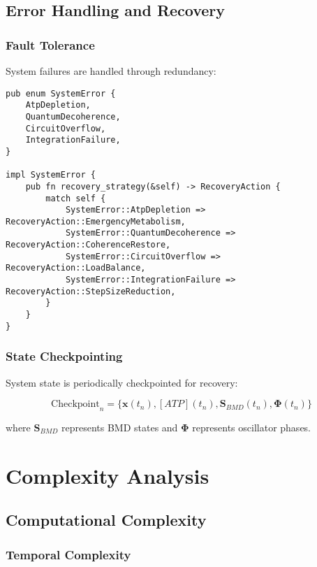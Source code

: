 \documentclass[12pt,a4paper]{article}
\begin{document}
\subsection{Error Handling and Recovery}

\subsubsection{Fault Tolerance}

System failures are handled through redundancy:

\begin{lstlisting}[style=ruststyle]
pub enum SystemError {
    AtpDepletion,
    QuantumDecoherence,
    CircuitOverflow,
    IntegrationFailure,
}

impl SystemError {
    pub fn recovery_strategy(&self) -> RecoveryAction {
        match self {
            SystemError::AtpDepletion => RecoveryAction::EmergencyMetabolism,
            SystemError::QuantumDecoherence => RecoveryAction::CoherenceRestore,
            SystemError::CircuitOverflow => RecoveryAction::LoadBalance,
            SystemError::IntegrationFailure => RecoveryAction::StepSizeReduction,
        }
    }
}
\end{lstlisting}

\subsubsection{State Checkpointing}

System state is periodically checkpointed for recovery:

\begin{equation}
\text{Checkpoint}_n = \{\mathbf{x}(t_n), [ATP](t_n), \mathbf{S}_{BMD}(t_n), \mathbf{\Phi}(t_n)\}
\end{equation}

where $\mathbf{S}_{BMD}$ represents BMD states and $\mathbf{\Phi}$ represents oscillator phases.

\section{Complexity Analysis}

\subsection{Computational Complexity}

\subsubsection{Temporal Complexity}
\end{document}
